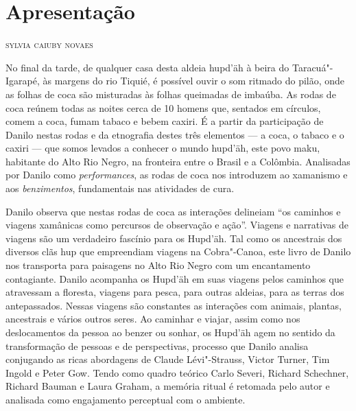 \pagestyle{apre}
\chapter*{Apresentação\smallskip{}}


\begin{flushright}
\textsc{sylvia caiuby novaes}
\end{flushright}

\noindent{}No final da tarde, de qualquer casa desta aldeia hupd'äh à beira do
Taracuá"-Igarapé, às margens do rio Tiquié, é possível ouvir o som
ritmado do pilão, onde as folhas de coca são misturadas às folhas
queimadas de imbaúba. As rodas de coca reúnem todas as noites cerca de
10 homens que, sentados em círculos, comem a coca, fumam tabaco e bebem
caxiri. É a partir da participação de Danilo nestas rodas e da
etnografia destes três elementos --- a coca, o tabaco e o caxiri --- que
somos levados a conhecer o mundo hupd'äh, este povo maku, habitante do
Alto Rio Negro, na fronteira entre o Brasil e a Colômbia. Analisadas por
Danilo como \textit{performances}, as rodas de coca nos introduzem ao
xamanismo e aos \textit{benzimentos}, fundamentais nas atividades de cura.

Danilo observa que nestas rodas de coca as interações delineiam ``os
caminhos e viagens xamânicas como percursos de observação e ação''.
Viagens e narrativas de viagens são um verdadeiro fascínio para os
Hupd'äh. Tal como os ancestrais dos diversos clãs hup que empreendiam
viagens na Cobra"-Canoa, este livro de Danilo nos transporta para
paisagens no Alto Rio Negro com um encantamento contagiante. Danilo
acompanha os Hupd'äh em suas viagens pelos caminhos que atravessam a
floresta, viagens para pesca, para outras aldeias, para as terras dos
antepassados. Nessas viagens são constantes as interações com animais,
plantas, ancestrais e vários outros seres. Ao caminhar e viajar, assim
como nos deslocamentos da pessoa ao benzer ou sonhar, os Hupd'äh agem no
sentido da transformação de pessoas e de perspectivas, processo que
Danilo analisa conjugando as ricas abordagens de Claude Lévi"-Strauss,
Victor Turner, Tim Ingold e Peter Gow. Tendo como quadro teórico Carlo
Severi, Richard Schechner, Richard Bauman e Laura Graham, a memória
ritual é retomada pelo autor e analisada como engajamento perceptual com
o ambiente.

